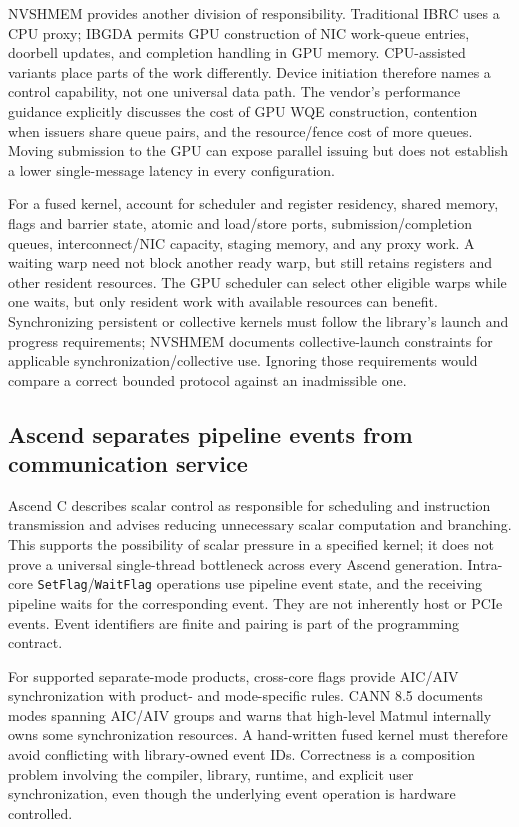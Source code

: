 NVSHMEM provides another division of responsibility. Traditional IBRC uses a CPU proxy; IBGDA permits GPU construction of NIC work-queue entries, doorbell updates, and completion handling in GPU memory. CPU-assisted variants place parts of the work differently. Device initiation therefore names a control capability, not one universal data path. The vendor's performance guidance explicitly discusses the cost of GPU WQE construction, contention when issuers share queue pairs, and the resource/fence cost of more queues. Moving submission to the GPU can expose parallel issuing but does not establish a lower single-message latency in every configuration.~\citep{u006-nvshmem-ibgda,u006-nvshmem-performance}

For a fused kernel, account for scheduler and register residency, shared memory, flags and barrier state, atomic and load/store ports, submission/completion queues, interconnect/NIC capacity, staging memory, and any proxy work. A waiting warp need not block another ready warp, but still retains registers and other resident resources. The GPU scheduler can select other eligible warps while one waits, but only resident work with available resources can benefit. Synchronizing persistent or collective kernels must follow the library's launch and progress requirements; NVSHMEM documents collective-launch constraints for applicable synchronization/collective use. Ignoring those requirements would compare a correct bounded protocol against an inadmissible one.~\citep{u006-nvshmem-using}

\subsection{Ascend separates pipeline events from communication service}

Ascend C describes scalar control as responsible for scheduling and instruction transmission and advises reducing unnecessary scalar computation and branching. This supports the possibility of scalar pressure in a specified kernel; it does not prove a universal single-thread bottleneck across every Ascend generation. Intra-core \texttt{SetFlag}/\texttt{WaitFlag} operations use pipeline event state, and the receiving pipeline waits for the corresponding event. They are not inherently host or PCIe events. Event identifiers are finite and pairing is part of the programming contract.~\citep{u006-ascend-architecture,u006-ascend-flags}

For supported separate-mode products, cross-core flags provide AIC/AIV synchronization with product- and mode-specific rules. CANN 8.5 documents modes spanning AIC/AIV groups and warns that high-level Matmul internally owns some synchronization resources. A hand-written fused kernel must therefore avoid conflicting with library-owned event IDs. Correctness is a composition problem involving the compiler, library, runtime, and explicit user synchronization, even though the underlying event operation is hardware controlled.~\citep{u006-ascend-crosscore}

